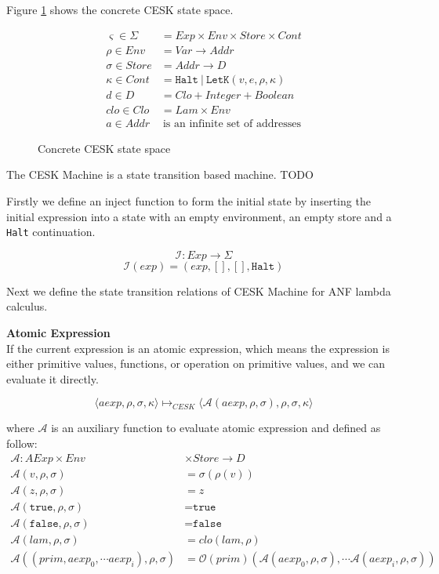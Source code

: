 \documentclass[paper=a4, fontsize=11pt]{scrartcl} %
\numberwithin{equation}{section} %
\numberwithin{figure}{section} %
\numberwithin{table}{section} %
\begin{document}
Figure \ref{fig3} shows the concrete CESK state space.

\begin{figure}[h!]
\begin{align*}
\varsigma \in \Sigma & = Exp \times Env \times Store \times Cont \\
\rho \in Env & = Var \rightarrow Addr \\
\sigma \in Store & = Addr \rightarrow D \\
\kappa \in Cont & = \texttt{Halt} ~|~ \texttt{LetK}(v,e,\rho,\kappa) \\
d \in D & = Clo + Integer + Boolean \\
clo \in Clo & = Lam \times Env \\
a \in Addr & ~ \mbox{is an infinite set of addresses}
\end{align*}
\caption{Concrete CESK state space}
\label{fig3}
\end{figure}

The CESK Machine is a state transition based machine.  TODO

Firstly we define an inject function to form the initial state by inserting the initial expression into a state with an empty environment, an empty store and a \texttt{Halt} continuation.

$$ \mathcal{I} : Exp \rightarrow \Sigma $$
$$ \mathcal{I}(exp) = (exp, [], [], \texttt{Halt}) $$

Next we define the state transition relations of CESK Machine for ANF lambda calculus.

\textbf{Atomic Expression}\\
If the current expression is an atomic expression, which means the expression is either primitive values, functions, or operation on primitive values, and we can evaluate it directly.

$$ \langle aexp, \rho, \sigma, \kappa \rangle \longmapsto_{CESK} \langle \mathcal{A}(aexp, \rho, \sigma), \rho, \sigma, \kappa \rangle $$

where $\mathcal{A}$ is an auxiliary function to evaluate atomic expression and defined as follow:
\begin{align*}
\mathcal{A} : AExp \times Env & \times Store \rightarrow D \\
\mathcal{A}(v, \rho, \sigma) & = \sigma(\rho(v)) \\
\mathcal{A}(z, \rho, \sigma) & = z \\
\mathcal{A}(\texttt{true}, \rho, \sigma) & = \texttt{true} \\
\mathcal{A}(\texttt{false}, \rho, \sigma) & = \texttt{false} \\
\mathcal{A}(lam, \rho, \sigma) & = clo(lam, \rho)  \\
\mathcal{A}((prim, aexp_0, \cdots aexp_i), \rho, \sigma) & = \mathcal{O}(prim)(\mathcal{A}(aexp_0, \rho, \sigma), \cdots \mathcal{A}(aexp_i, \rho, \sigma))
\end{align*}
\end{document}
